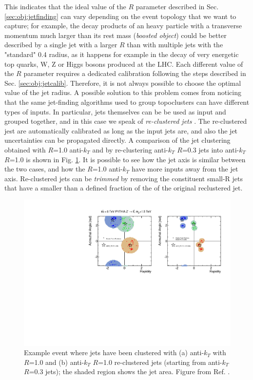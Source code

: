 This indicates that the ideal value of the $R$ parameter described in Sec. \ref{sec:obj:jetfinding} can vary depending on the event topology that we want to capture;
for example, the decay products of an heavy particle with a transverse momentum much larger than its rest mass (\textit{boosted object}) could be better described by a 
single jet with a larger $R$ than with multiple jets with the "standard" 0.4 radius, 
as it happens for example in the decay of very energetic top quarks, W, Z or Higgs bosons produced at the LHC.
Each different value of the $R$ parameter requires a dedicated calibration following the steps described in Sec. \ref{sec:obj:jetcalib}. 
Therefore, it is not always possible to choose the optimal value of the jet radius. 
A possible solution to this problem comes from noticing that the same jet-finding algorithms used to group topoclusters can have different types of inputs. 
In particular, jets themselves can be be used as input and grouped together, and in this case we speak of \textit{re-clustered jets} \cite{Nachman:2014kla}. 
The re-clustered jest are automatically calibrated as long as the input jets are, and also the jet uncertainties can be propagated directly. 
A comparison of the jet clustering obtained with $R$=1.0 anti-$k_T$ and by re-clustering anti-$k_T$ $R$=0.3 jets into anti-$k_T$ $R$=1.0
is shown in Fig. \ref{fig:recluster}. It is possible to see how the jet axis is similar between the two cases, and how the $R$=1.0 anti-$k_T$ have more inputs away from the jet axis.
Re-clustered jets can be \textit{trimmed} by removing the constituent small-R jets that have a \pt smaller than a defined fraction of the \pt of the original reclustered jet. 


\begin{figure}[h]
\begin{center}
\includegraphics[width=1.0\textwidth]{./figures/objects/reclustered.pdf}
\end{center}
\caption{Example event where jets have been clustered with (a) anti-$k_T$ with $R$=1.0 and (b) anti-$k_T$ $R$=1.0 re-clustered jets (starting from anti-$k_T$ $R$=0.3 jets); the shaded region shows the jet area. Figure from Ref. \cite{Nachman:2014kla}.}
\label{fig:recluster}
\end{figure}


